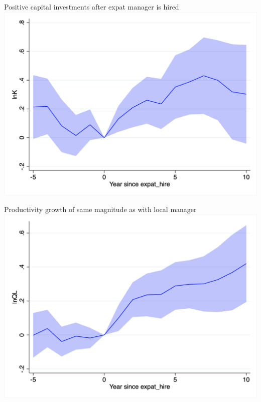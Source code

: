 \documentclass[
  ignorenonframetext,
  aspectratio=43,
]{beamer}
\begin{document}
\begin{frame}{Positive capital investments after expat manager is hired}
\protect\hypertarget{positive-capital-investments-after-expat-manager-is-hired}{}
\includegraphics{figure/event_study/expat_hire_lnK.png}
\end{frame}

\begin{frame}{Productivity growth of same magnitude as with local
manager}
\protect\hypertarget{productivity-growth-of-same-magnitude-as-with-local-manager}{}
\includegraphics{figure/event_study/expat_hire_lnQL.png}
\end{frame}
\end{document}
